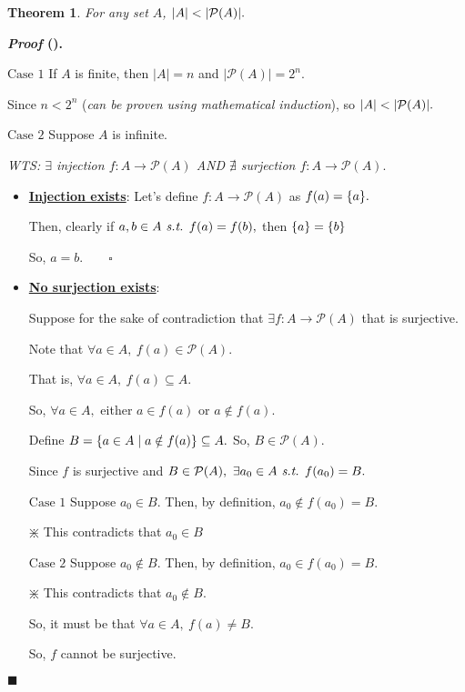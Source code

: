 \documentclass[12pt,a4paper]{article}
\newtheorem{thm}{Theorem}[subsection]
\newcounter{nprf}[subsection]
\newenvironment*{prf}{\par\indent\textbf{\textit{Proof} (\stepcounter{nprf}\thenprf). }\par }{\par\hfill $\blacksquare$\par}
\def\pow{{\mathcal{P}}}
\def\st{\emph{ s.t. }}
\begin{document}
\begin{framed}
\begin{thm}\label{thm6.2.2}
	For any set $A$, $\qty|A|<\qty|\pow(A)|.$	
\end{thm}
\begin{prf}
	$\boxed{\text{Case }1}$ If $A$ is finite, then $|A|=n$ and $|\pow(A)|=2^n.$\par\hspace{5mm} Since $n<2^n$ (\textit{can be proven using mathematical induction}), so $\qty|A|<\qty|\pow(A)|.$\par $\boxed{\text{Case }2}$ Suppose $A$ is infinite.\par\hspace{5mm}\textit{WTS: $\exists$ injection $f:A\to\pow(A)$ AND $\nexists$ surjection $f:A\to\pow(A).$}\begin{itemize}
		\item \textbf{\underline{Injection exists}}: Let's define $f:A\to\pow(A)$ as $f(a)=\qty{a}.$\par Then, clearly if $a,b\in A\st f(a)=f(b),$ then $\qty{a}=\qty{b}$\par So, $a=b.\qquad\square$
		\item \textbf{\underline{No surjection exists}}: \par Suppose for the sake of contradiction that $\exists f:A\to\pow(A)$ that is surjective.\par Note that $\forall a\in A,\ f(a)\in\pow(A).$\par That is, $\forall a\in A,\ f(a)\subseteq A.$\par So, $\forall a\in A,$ either $a\in f(a)$ or $a\notin f(a).$\par Define $B=\qty{a\in A\mid a\notin f(a)}\subseteq A.$ So, $B\in\pow(A).$\par Since $f$ is surjective and $B\in\pow(A),\ \exists a_0\in A\st f(a_0)=B.$\par$\boxed{\text{Case 1}}$ Suppose $a_0\in B.$ Then, by definition, $a_0\notin f(a_0)=B.$\begin{center}$\divideontimes$ This contradicts that $a_0\in B$\end{center}\par $\boxed{\text{Case }2}$ Suppose $a_0\notin B.$ Then, by definition, $a_0\in f(a_0)=B.$\begin{center}$\divideontimes$ This contradicts that $a_0\notin B.$\end{center}\par So, it must be that $\forall a\in A,\ f(a)\neq B.$\par So, $f$ cannot be surjective. 
	\end{itemize}
\end{prf}
\end{framed}
\end{document}
